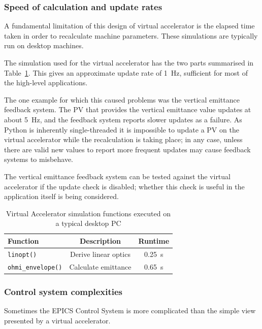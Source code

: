 \documentclass[a4paper,
               keeplastbox,   %
               ]{jacow}
\begin{document}
\subsubsection{Speed of calculation and update rates}

A fundamental limitation of this design of virtual accelerator is the elapsed time
taken in order to recalculate machine parameters. These simulations are typically
run on desktop machines.

The simulation used for the virtual accelerator has the two parts summarised in 
Table~\ref{simfunctions}. This gives an approximate update rate of \SI{1}{Hz}, sufficient
for most of the high-level applications.

The one example for which this caused problems was the vertical emittance feedback
system. The PV that provides the vertical emittance value updates at about \SI{5}{Hz},
and the feedback system reports slower updates as a failure. As Python is inherently
single-threaded it is impossible to update a PV on the virtual accelerator while 
the recalculation is taking place; in any case, unless there are valid new values to
report more frequent updates may cause feedback systems to misbehave.

The vertical emittance feedback system can be tested against the virtual accelerator
if the update check is disabled; whether this check is useful in the application itself is
being considered.

\begin{table}[!hbt]
   \centering
   \caption{Virtual Accelerator simulation functions executed on a typical desktop PC}
   \begin{tabular}{lcc}
       \toprule
       \textbf{Function} & \textbf{Description}                      & \textbf{Runtime} \\
       \midrule
           \texttt{linopt()}         & Derive linear optics            & \SI{0.25}{s}        \\
           \texttt{ohmi\_envelope()}  & Calculate emittance      & \SI{0.65}{s}        \\
       \bottomrule
   \end{tabular}
   \label{simfunctions}
\end{table}

\subsubsection{Control system complexities}

Sometimes the EPICS Control System is more complicated than the simple view presented
by a virtual accelerator.
\end{document}
